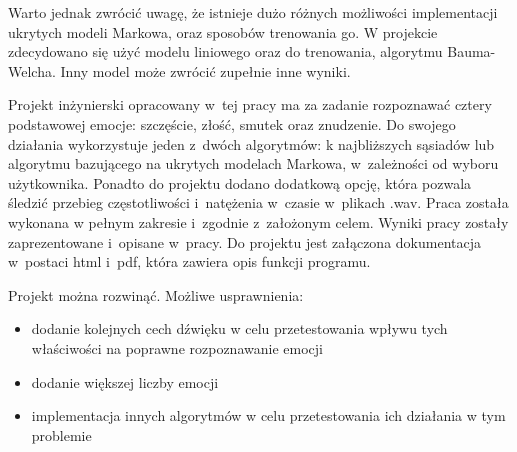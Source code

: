\documentclass[declaration,shortabstract]{iithesis}
\begin{document}
Warto jednak zwrócić uwagę, że istnieje dużo różnych możliwości implementacji ukrytych modeli Markowa, oraz sposobów trenowania go. W projekcie zdecydowano się użyć modelu liniowego oraz do trenowania, algorytmu Bauma-Welcha. Inny model może zwrócić zupełnie inne wyniki.

Projekt inżynierski opracowany w~tej pracy ma za zadanie rozpoznawać cztery podstawowej emocje: szczęście, złość, smutek oraz znudzenie. Do swojego działania wykorzystuje jeden z~dwóch algorytmów: k najbliższych sąsiadów lub algorytmu bazującego na ukrytych modelach Markowa, w~zależności od wyboru użytkownika. Ponadto do projektu dodano dodatkową opcję, która pozwala śledzić przebieg częstotliwości i~natężenia w~czasie w~plikach .wav. Praca została wykonana w pełnym zakresie i~zgodnie z~założonym celem. Wyniki pracy zostały zaprezentowane i~opisane w~pracy. Do projektu jest załączona dokumentacja w~postaci html i~pdf, która zawiera opis funkcji programu.

Projekt można rozwinąć. Możliwe usprawnienia:
\begin{itemize}
\item dodanie kolejnych cech dźwięku w celu przetestowania wpływu tych właściwości na poprawne rozpoznawanie emocji
\item dodanie większej liczby emocji
\item implementacja innych algorytmów w celu przetestowania ich działania w tym problemie
\end{itemize}

\listoffigures
\listoftables
\nocite{*}
\printbibliography
\end{document}
